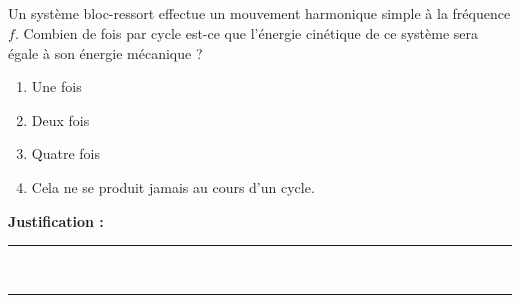 \subsection{}
Un système bloc-ressort effectue un mouvement harmonique simple à la fréquence $f$. Combien de fois par cycle est-ce que l’énergie cinétique de ce système sera égale à son énergie mécanique ?

\begin{enumerate}[label=\Alph*)]
    \item Une fois
    \item Deux fois
    \item Quatre fois
    \item Cela ne se produit jamais au cours d’un cycle.
\end{enumerate}

\noindent\textbf{Justification :} \hrulefill \\[2.5ex]
\rule{\linewidth}{0.4pt} \\[2.5ex]
\rule{\linewidth}{0.4pt}
\vfill